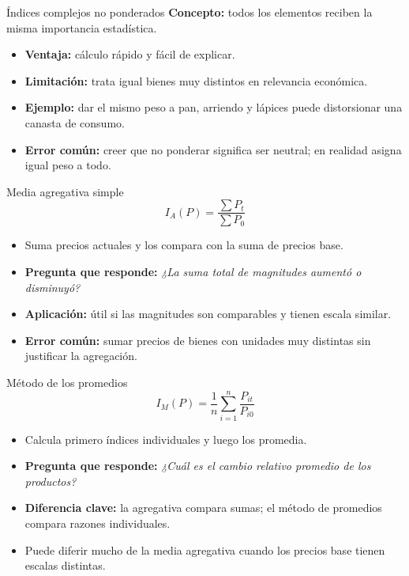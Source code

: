 \documentclass[aspectratio=169,11pt]{beamer}
\newcommand{\pregunta}[1]{\textbf{Pregunta que responde:} \emph{#1}}
\newcommand{\errorcomun}[1]{\textbf{Error común:} #1}
\newcommand{\diferencia}[1]{\textbf{Diferencia clave:} #1}
\begin{document}
\begin{frame}{Índices complejos no ponderados}
\textbf{Concepto:} todos los elementos reciben la misma importancia estadística.
\begin{itemize}
  \item \textbf{Ventaja:} cálculo rápido y fácil de explicar.
  \item \textbf{Limitación:} trata igual bienes muy distintos en relevancia económica.
  \item \textbf{Ejemplo:} dar el mismo peso a pan, arriendo y lápices puede distorsionar una canasta de consumo.
  \item \errorcomun{creer que no ponderar significa ser neutral; en realidad asigna igual peso a todo.}
\end{itemize}
\end{frame}

\begin{frame}{Media agregativa simple}
\[
I_A(P)=\frac{\sum P_t}{\sum P_0}
\]
\begin{itemize}
  \item Suma precios actuales y los compara con la suma de precios base.
  \item \pregunta{¿La suma total de magnitudes aumentó o disminuyó?}
  \item \textbf{Aplicación:} útil si las magnitudes son comparables y tienen escala similar.
  \item \errorcomun{sumar precios de bienes con unidades muy distintas sin justificar la agregación.}
\end{itemize}
\end{frame}

\begin{frame}{Método de los promedios}
\[
I_M(P)=\frac{1}{n}\sum_{i=1}^{n}\frac{P_{it}}{P_{i0}}
\]
\begin{itemize}
  \item Calcula primero índices individuales y luego los promedia.
  \item \pregunta{¿Cuál es el cambio relativo promedio de los productos?}
  \item \diferencia{la agregativa compara sumas; el método de promedios compara razones individuales.}
  \item Puede diferir mucho de la media agregativa cuando los precios base tienen escalas distintas.
\end{itemize}
\end{frame}
\end{document}
